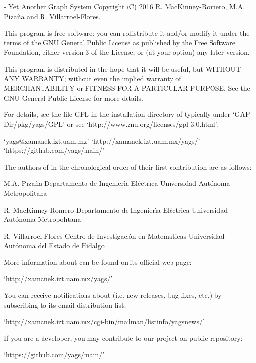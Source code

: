 
{\YAGS} - Yet Another Graph System\newline
Copyright (C) 2016  R. MacKinney-Romero, M.A. Piza{\~n}a and R. Villarroel-Flores.

This program is free software: you can redistribute it and/or modify
it under the terms of the GNU General Public License as published by
the Free Software Foundation, either version 3 of the License, or
(at your option) any later version.

This program is distributed in the hope that it will be useful,
but WITHOUT ANY WARRANTY; without even the implied warranty of
MERCHANTABILITY or FITNESS FOR A PARTICULAR PURPOSE.  See the
GNU General Public License for more details.

For details, see the file GPL in the installation directory of {\YAGS} typically 
under `GAP-Dir/pkg/yags/GPL' or see `http://www.gnu.org/licenses/gpl-3.0.html'.

`yags@xamanek.izt.uam.mx'\newline
`http://xamanek.izt.uam.mx/yags/'\newline
`https://github.com/yags/main/'


The authors of {\YAGS} in the chronological order of their first contribution are as follows:

M.A. Piza{\~n}a\newline
Departamento de Ingenier\'{\i}a El\'{e}ctrica\newline
Universidad Aut\'{o}noma Metropolitana\newline
{}

R. MacKinney-Romero\newline
Departamento de Ingenier\'{\i}a El\'{e}ctrica\newline
Universidad Aut\'{o}noma Metropolitana\newline
{}

R. Villarroel-Flores\newline
Centro de Investigaci\'{o}n en Matem\'{a}ticas\newline
Universidad Aut\'{o}noma del Estado de Hidalgo\newline
{}


More information about {\YAGS} can be found on its official web page:

`http://xamanek.izt.uam.mx/yags/'

You can receive notifications about {\YAGS} (i.e. new releases, bug fixes, etc.) by subscribing to its email distribution list:

`http://xamanek.izt.uam.mx/cgi-bin/mailman/listinfo/yagsnews/'

If you are a developer, you may contribute to our project on public repository:

`https://github.com/yags/main/'


